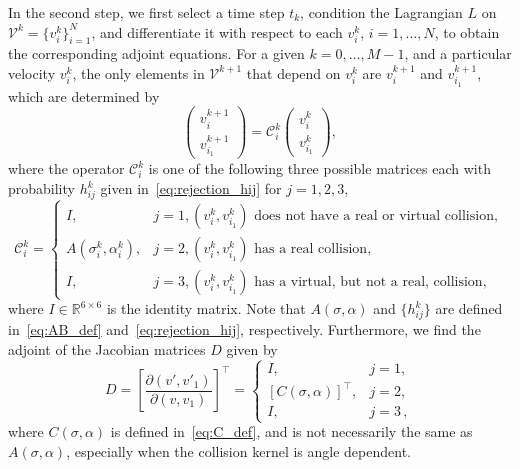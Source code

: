 \documentclass[12pt]{amsart}
\newcommand{\cal}{\mathcal}
\begin{document}
In the second step, we first select a time step $t_k$, condition the Lagrangian $L$ on $\mathcal{V}^k = \{v_i^{k}\}_{i=1}^N$, and  differentiate it
with respect to each $v_i^k$, $i=1,\ldots, N$, to obtain the corresponding adjoint equations. For a given $k = 0,\ldots, M-1$, and a particular velocity $v_i^{k}$, the only elements in ${\cal V}^{k+1}$ that depend on $v_i^k$ are $v_i^{k+1}$ and $v_{i_1}^{k+1}$, which are determined by 
\begin{equation} \label{eq:general_collision}
\begin{pmatrix}
v_i^{k+1}\\
v_{i_1}^{k+1}
\end{pmatrix} = 
\mathcal{C}^k_{i} 
\begin{pmatrix}
v_i^{k}\\
v_{i_1}^{k}
\end{pmatrix},
\end{equation}
where the operator $\mathcal{C}_{i}^k$ is one of the following three possible matrices each with probability $h_{ij}^k$ given in~\eqref{eq:rejection_hij} for $j=1,2,3$,
\begin{equation}\label{eq:collision_operator}
{\cal C}_i^k = 
    \begin{cases}
    I,  & j=1, \text{$(v_i^k,v_{i_1}^k)$ does not have a real or virtual collision}, \\
     A(\sigma_i^k, \alpha_i^k), & j=2,  \text{$(v_i^k,v_{i_1}^k)$ has a real collision},\\
    I, & j=3,  \text{$(v_i^k,v_{i_1}^k)$ has a virtual, but not a real, collision},
    \end{cases}
\end{equation}
where $I \in \mathbb{R}^{6\times 6}$ is the identity matrix.  Note that $A(\sigma,\alpha)$ and $\{h_{ij}^k\}$ are defined in~\eqref{eq:AB_def} and~\eqref{eq:rejection_hij}, respectively. Furthermore, we find the adjoint of the Jacobian matrices $D$ given by
\begin{equation} \label{eq:back_D}
    D =  \left[ \dfrac{\partial (v',v'_{1})}{\partial (v,v_1)} \right]^\top = \begin{cases}
    I,  & j=1, \\
    [C(\sigma, \alpha)]^\top , & j=2,\\
    I, & j=3\,,
    \end{cases}
\end{equation}
where $C(\sigma,\alpha)$ is defined in~\eqref{eq:C_def}, and is not necessarily the same as $A(\sigma,\alpha)$, especially when the collision kernel is angle dependent.
\end{document}
